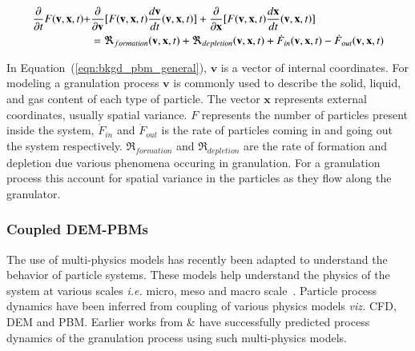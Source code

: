 \documentclass[preprint,11pt,authoryear]{elsarticle}
\begin{document}
\begin{align}
\frac{ \partial}{\partial t}F(\textbf{v},\textbf{x},t) +& \frac{\partial}{\partial 
\textbf{v}}[F(\textbf{v},\textbf{x},t)\frac{d\textbf{v}}{dt}(\textbf{v},\textbf{x},t)] 
+ \frac{\partial}{\partial \textbf{x}}[F(\textbf{v},\textbf{x},t)\frac{d\textbf{x}}{dt}
(\textbf{v},\textbf{x},t)] \notag\\
    &= 
\Re_{formation}(\textbf{v},\textbf{x},t)+\Re_{depletion}(\textbf{v},\textbf{x},t)
+\dot{F}_{in}(\textbf{v},\textbf{x},t)-\dot{F}_{out}(\textbf{v},\textbf{x},t)
\label{eqn:bkgd_pbm_general} 
\end{align}
    
In Equation~(\ref{eqn:bkgd_pbm_general}), $\textbf{v}$ is a vector of internal 
coordinates. For modeling a granulation process $\textbf{v}$ is commonly used 
to describe the solid, liquid, and gas content of each type of particle. The 
vector $\textbf{x}$ represents external coordinates, usually spatial variance. 
\textbf{$F$} represents the number of particles present inside the system, 
\textbf{$\dot{F}_{in}$} and \textbf{$\dot{F}_{out}$} is the rate of particles 
coming in and going out the system respectively. $\Re_{formation}$ and $\Re_{depletion}$ 
are the rate of formation and depletion due various phenomena occuring in granulation. 
For a granulation process this account for spatial variance in the particles as 
they flow along the granulator.

\subsubsection{Coupled DEM-PBMs}
The use of multi-physics models has recently been adapted to understand the behavior of 
particle systems. These models help understand the physics of the system at various scales 
\textit{i.e.} micro, meso and macro scale~\citep{sen2014}. Particle process dynamics have been 
inferred from coupling of various physics models \textit{viz.} CFD, 
DEM and PBM. Earlier works from \cite{sen2014} \& \cite{Barrasso2015cerd} have successfully 
predicted process dynamics of the granulation process using such multi-physics models.
\end{document}
